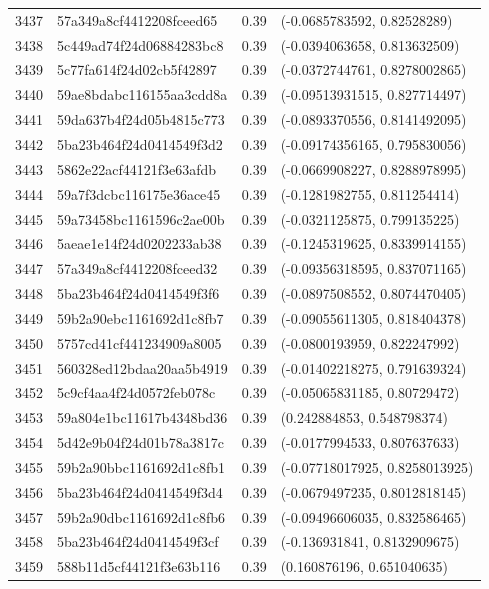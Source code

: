 \begin{table}[ht]
\begin{tabular}{rlrl}
  3437 & 57a349a8cf4412208fceed65 & 0.39 & (-0.0685783592, 0.82528289) \\ 
  3438 & 5c449ad74f24d06884283bc8 & 0.39 & (-0.0394063658, 0.813632509) \\ 
  3439 & 5c77fa614f24d02cb5f42897 & 0.39 & (-0.0372744761, 0.8278002865) \\ 
  3440 & 59ae8bdabc116155aa3cdd8a & 0.39 & (-0.09513931515, 0.827714497) \\ 
  3441 & 59da637b4f24d05b4815c773 & 0.39 & (-0.0893370556, 0.8141492095) \\ 
  3442 & 5ba23b464f24d0414549f3d2 & 0.39 & (-0.09174356165, 0.795830056) \\ 
  3443 & 5862e22acf44121f3e63afdb & 0.39 & (-0.0669908227, 0.8288978995) \\ 
  3444 & 59a7f3dcbc116175e36ace45 & 0.39 & (-0.1281982755, 0.811254414) \\ 
  3445 & 59a73458bc1161596c2ae00b & 0.39 & (-0.0321125875, 0.799135225) \\ 
  3446 & 5aeae1e14f24d0202233ab38 & 0.39 & (-0.1245319625, 0.8339914155) \\ 
  3447 & 57a349a8cf4412208fceed32 & 0.39 & (-0.09356318595, 0.837071165) \\ 
  3448 & 5ba23b464f24d0414549f3f6 & 0.39 & (-0.0897508552, 0.8074470405) \\ 
  3449 & 59b2a90ebc1161692d1c8fb7 & 0.39 & (-0.09055611305, 0.818404378) \\ 
  3450 & 5757cd41cf441234909a8005 & 0.39 & (-0.0800193959, 0.822247992) \\ 
  3451 & 560328ed12bdaa20aa5b4919 & 0.39 & (-0.01402218275, 0.791639324) \\ 
  3452 & 5c9cf4aa4f24d0572feb078c & 0.39 & (-0.05065831185, 0.80729472) \\ 
  3453 & 59a804e1bc11617b4348bd36 & 0.39 & (0.242884853, 0.548798374) \\ 
  3454 & 5d42e9b04f24d01b78a3817c & 0.39 & (-0.0177994533, 0.807637633) \\ 
  3455 & 59b2a90bbc1161692d1c8fb1 & 0.39 & (-0.07718017925, 0.8258013925) \\ 
  3456 & 5ba23b464f24d0414549f3d4 & 0.39 & (-0.0679497235, 0.8012818145) \\ 
  3457 & 59b2a90dbc1161692d1c8fb6 & 0.39 & (-0.09496606035, 0.832586465) \\ 
  3458 & 5ba23b464f24d0414549f3cf & 0.39 & (-0.136931841, 0.8132909675) \\ 
  3459 & 588b11d5cf44121f3e63b116 & 0.39 & (0.160876196, 0.651040635) \\ 

\end{tabular}
\end{table}
